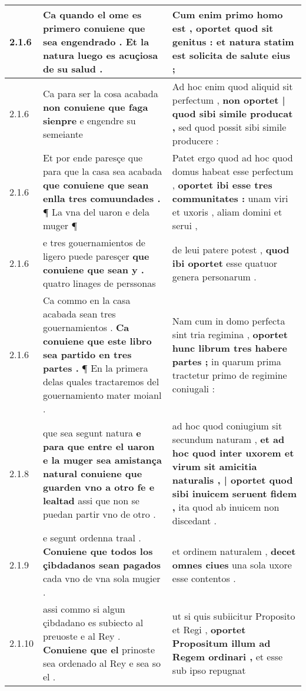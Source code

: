 \begin{tabular}{|p{1cm}|p{6.5cm}|p{6.5cm}|}
2.1.6 & Ca quando el ome es primero \textbf{ conuiene que sea engendrado . } Et la natura luego es acuçiosa de su salud . & Cum enim primo homo est , \textbf{ oportet quod sit genitus : } et natura statim est solicita de salute eius ; \\\hline
2.1.6 & Ca para ser la cosa acabada \textbf{ non conuiene que faga sienpre } e engendre su semeiante & Ad hoc enim quod aliquid sit perfectum , \textbf{ non oportet | quod sibi simile producat , } sed quod possit sibi simile producere : \\\hline
2.1.6 & Et por ende paresçe que para que la casa sea acabada \textbf{ que conuiene que sean enlla tres comuundades . } ¶ La vna del uaron e dela muger ¶ & Patet ergo quod ad hoc quod domus habeat esse perfectum , \textbf{ oportet ibi esse tres communitates : } unam viri et uxoris , aliam domini et serui , \\\hline
2.1.6 & e tres gouernamientos de ligero puede paresçer \textbf{ que conuiene que sean y . } quatro linages de perssonas & de leui patere potest , \textbf{ quod ibi oportet } esse quatuor genera personarum . \\\hline
2.1.6 & Ca commo en la casa acabada sean tres gouernamientos . \textbf{ Ca conuiene que este libro sea partido en tres partes . } ¶ En la primera delas quales tractaremos del gouernamiento mater moianl . & Nam cum in domo perfecta sint tria regimina , \textbf{ oportet hunc librum tres habere partes ; } in quarum prima tractetur primo de regimine coniugali : \\\hline
2.1.8 & que sea segunt natura \textbf{ e para que entre el uaron e la muger sea amistança natural conuiene que guarden vno a otro fe e lealtad } assi que non se puedan partir vno de otro . & ad hoc quod coniugium sit secundum naturam , \textbf{ et ad hoc quod inter uxorem et virum sit amicitia naturalis , | oportet quod sibi inuicem seruent fidem , } ita quod ab inuicem non discedant . \\\hline
2.1.9 & e segunt ordenna traal . \textbf{ Conuiene que todos los çibdadanos sean pagados } cada vno de vna sola mugier . & et ordinem naturalem , \textbf{ decet omnes ciues } una sola uxore esse contentos . \\\hline
2.1.10 & assi commo si algun çibdadano es subiecto al preuoste e al Rey . \textbf{ Conuiene que el } prinoste sea ordenado al Rey e sea so el . & ut si quis subiicitur Proposito et Regi , \textbf{ oportet Propositum illum ad Regem ordinari , } et esse sub ipso repugnat \\\hline

\end{tabular}
